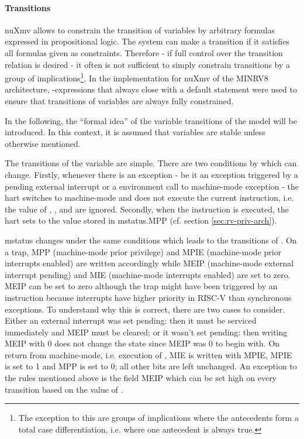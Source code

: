 \paragraph{Transitions}
nuXmv allows to constrain the transition of variables by arbitrary formulas expressed in propositional logic.
The system can make a transition if it satisfies all formulas given as constraints.
Therefore - if full control over the transition relation is desired - it often is not sufficient to simply constrain transitions by a group of implications\footnote{%
    The exception to this are groups of implications where the antecedents form a total case differentiation, i.e. where one antecedent is always true.
}.
In the implementation for nuXmv of the MINRV8 architecture, -expressions that always close with a default statement were used to ensure that transitions of variables are always fully constrained.

In the following, the \enquote{formal idea} of the variable transitions of the model will be introduced.
In this context, it is assumed that variables are stable unless otherwise mentioned.

The transitions of the  variable are simple.
There are two conditions by which  can change.
Firstly, whenever there is an exception - be it an exception triggered by a pending external interrupt or a environment call to machine-mode exception - the \gls{hart} switches to machine-mode and does not execute the current instruction, i.e. the value of , ,  and  are ignored.
Secondly, when the  instruction is executed, the \gls{hart} sets  to the value stored in \gls{mstatus}.MPP (cf. section \ref{sec:rv-priv-arch}).

\gls{mstatus} changes under the same conditions which leads to the transitions of .
On a trap, MPP (machine-mode prior privilege) and MPIE (machine-mode prior interrupts enabled) are written accordingly while MEIP (machine-mode external interrupt pending) and MIE (machine-mode interrupts enabled) are set to zero.
MEIP can be set to zero although the trap might have been triggered by an  instruction because interrupts have higher priority in RISC-V than synchronous exceptions.
To understand why this is correct, there are two cases to consider.
Either an external interrupt was set pending: then it must be serviced immediately and MEIP must be cleared; or it wasn't set pending: then writing MEIP with 0 does not change the state since MEIP was 0 to begin with.
On return from machine-mode, i.e. execution of , MIE is written with MPIE, MPIE is set to 1 and MPP is set to 0; all other bits are left unchanged.
An exception to the rules mentioned above is the field MEIP which can be set high on every transition based on the value of .

